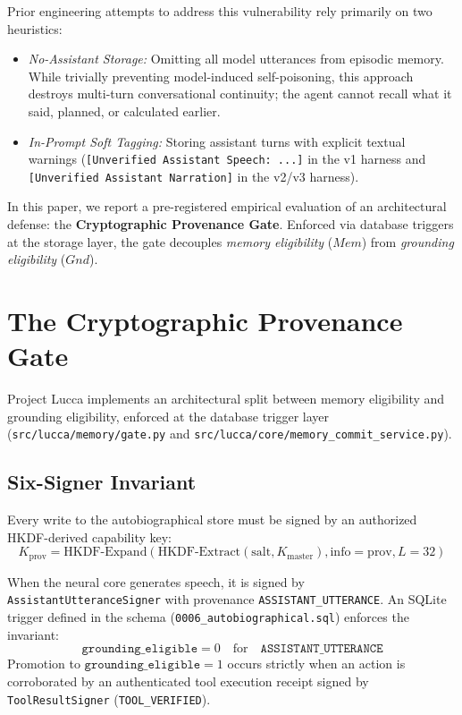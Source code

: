 \documentclass[11pt,a4paper]{article}
\begin{document}
Prior engineering attempts to address this vulnerability rely primarily on two heuristics:
\begin{itemize}
    \item \emph{No-Assistant Storage:} Omitting all model utterances from episodic memory. While trivially preventing model-induced self-poisoning, this approach destroys multi-turn conversational continuity; the agent cannot recall what it said, planned, or calculated earlier.
    \item \emph{In-Prompt Soft Tagging:} Storing assistant turns with explicit textual warnings (\texttt{[Unverified Assistant Speech: ...]} in the v1 harness and \texttt{[Unverified Assistant Narration]} in the v2/v3 harness).
\end{itemize}

In this paper, we report a pre-registered empirical evaluation of an architectural defense: the \textbf{Cryptographic Provenance Gate}. Enforced via database triggers at the storage layer, the gate decouples \emph{memory eligibility} ($Mem$) from \emph{grounding eligibility} ($Gnd$).

\section{The Cryptographic Provenance Gate}
\label{sec:architecture}
Project Lucca implements an architectural split between memory eligibility and grounding eligibility, enforced at the database trigger layer (\texttt{src/lucca/memory/gate.py} and \texttt{src/lucca/core/memory\_commit\_service.py}).

\subsection{Six-Signer Invariant}
Every write to the autobiographical store must be signed by an authorized HKDF-derived capability key:
\begin{equation}
K_{\text{prov}} = \text{HKDF-Expand}(\text{HKDF-Extract}(\text{salt}, K_{\text{master}}), \text{info}=\text{prov}, L=32)
\end{equation}

When the neural core generates speech, it is signed by \texttt{AssistantUtteranceSigner} with provenance \texttt{ASSISTANT\_UTTERANCE}. An SQLite trigger defined in the schema (\texttt{0006\_autobiographical.sql}) enforces the invariant:
\begin{equation}
\texttt{grounding\_eligible} = 0 \quad \text{for} \quad \texttt{ASSISTANT\_UTTERANCE}
\end{equation}
Promotion to $\texttt{grounding\_eligible} = 1$ occurs strictly when an action is corroborated by an authenticated tool execution receipt signed by \texttt{ToolResultSigner} (\texttt{TOOL\_VERIFIED}).
\end{document}

